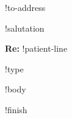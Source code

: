 \documentclass{letter}
\begin{document}
\begin{letter}{!to-address
}

\opening{!salutation}

\textbf{Re:} !patient-line 

!type

!body

\closing{!finish}
\end{letter}
\end{document}
